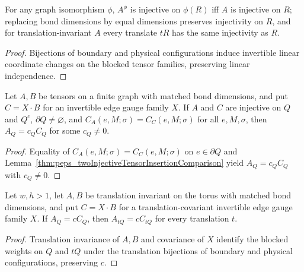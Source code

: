 \begin{lemma}%
    \label{thm:peps_region_injective_identification}
    \leanok
    For any graph isomorphism $\phi$, $A^\phi$ is injective on $\phi(R)$ iff
    $A$ is injective on $R$; replacing bond dimensions by equal dimensions
    preserves injectivity on $R$, and for translation-invariant $A$ every
    translate $tR$ has the same injectivity as $R$.
\end{lemma}
\begin{proof}\leanok
    Bijections of boundary and physical configurations induce invertible linear
    coordinate changes on the blocked tensor families, preserving linear
    independence.
\end{proof}

\begin{lemma}%
    \label{thm:peps_block_proportional_absorbed}
    \leanok
    Let $A,B$ be tensors on a finite graph with matched bond dimensions, and
    put $C=X\cdot B$ for an invertible edge gauge family $X$. If $A$ and $C$
    are injective on $Q$ and $Q^c$, $\partial Q\ne\varnothing$, and
    $C_A(e,M;\sigma)=C_C(e,M;\sigma)$ for all $e,M,\sigma$, then $A_Q=c_Q C_Q$
    for some $c_Q\ne0$.
\end{lemma}
\begin{proof}\leanok
    Equality of $C_A(e,M;\sigma)=C_C(e,M;\sigma)$ on $e\in\partial Q$ and
    Lemma~\ref{thm:peps_twoInjectiveTensorInsertionComparison} yield
    $A_Q=c_Q C_Q$ with $c_Q\ne0$.
\end{proof}

\begin{lemma}%
    \label{thm:peps_block_proportional_translate}
    \leanok
    Let $w,h>1$, let $A,B$ be translation invariant on the torus with matched
    bond dimensions, and put $C=X\cdot B$ for a translation-covariant invertible
    edge gauge family $X$. If $A_Q=c C_Q$, then $A_{tQ}=c C_{tQ}$ for every
    translation $t$.
\end{lemma}
\begin{proof}\leanok
    Translation invariance of $A,B$ and covariance of $X$ identify the blocked
    weights on $Q$ and $tQ$ under the translation bijections of boundary and
    physical configurations, preserving $c$.
\end{proof}

